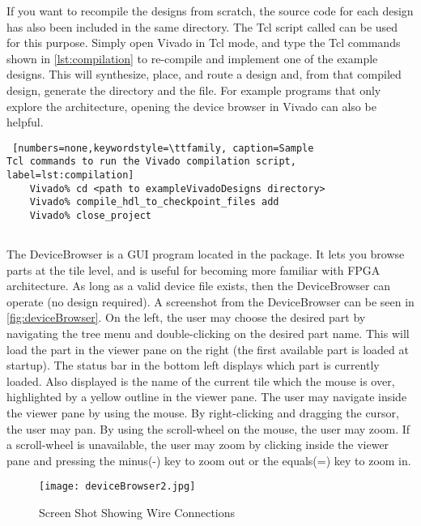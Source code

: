 If you want to recompile the designs from scratch, the source code for each
design has also been included in the same directory. The Tcl script called
 can be used for this purpose. Simply open Vivado in Tcl
mode, and type the Tcl commands shown in \autoref{lst:compilation} to re-compile
and implement one of the example designs. This will synthesize, place, and
route a design and, from that compiled design, generate the 
directory and the  file. For example programs that only explore the
architecture, opening the device browser in Vivado can also be helpful.
                 
\begin{lstlisting} [numbers=none,keywordstyle=\ttfamily, caption=Sample
Tcl commands to run the Vivado compilation script, label=lst:compilation] 
	Vivado% cd <path to exampleVivadoDesigns directory>
	Vivado% compile_hdl_to_checkpoint_files add
	Vivado% close_project
\end{lstlisting}

\subsection{}
The DeviceBrowser is a GUI program located in the 
 package. It lets you browse
parts at the tile level, and is useful for becoming more familiar with FPGA
architecture. As long as a valid device file exists, then the DeviceBrowser can
operate (no design required). A screenshot from the DeviceBrowser can be seen in
\autoref{fig:deviceBrowser}. On the left, the user may choose the desired part
by navigating the tree menu and double-clicking on the desired part name.
This will load the part in the viewer pane on the right (the first available
part is loaded at startup). The status bar in the bottom left displays which
part is currently loaded. Also displayed is the name of the current tile
which the mouse is over, highlighted by a yellow outline in the viewer pane.
The user may navigate inside the viewer pane by using the mouse. By
right-clicking and dragging the cursor, the user may pan. By using the
scroll-wheel on the mouse, the user may zoom. If a scroll-wheel is
unavailable, the user may zoom by clicking inside the viewer pane and pressing
the minus(-) key to zoom out or the equals(=) key to zoom in.

\begin{figure}[htb]
\centering
\texttt{[image: deviceBrowser2.jpg]}
\caption{ Screen Shot Showing Wire Connections}
\label{fig:deviceBrowser2}
\end{figure}

